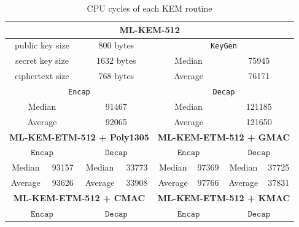 \documentclass[floatrow,journal=tches,submission]{iacrtrans}
\newcommand{\keygen}{\texttt{KeyGen}}
\newcommand{\encap}{\texttt{Encap}}
\newcommand{\decap}{\texttt{Decap}}
\begin{document}
\begin{table}
    \caption{CPU cycles of each KEM routine}\label{tbl:kem-performance}
    \begin{tabular}{|c|c|c|c|c|c|c|c|}
        \hline\hline
        \multicolumn{8}{|c|}{\bf ML-KEM-512} \\
        \hline
        \multicolumn{2}{|c|}{public key size} 
        & \multicolumn{2}{|c|}{800 bytes}
        & \multicolumn{4}{|c|}{ \keygen} \\
        \hline
        \multicolumn{2}{|c|}{secret key size} 
        & \multicolumn{2}{|c|}{1632 bytes} 
        & \multicolumn{2}{|c|}{Median} 
        & \multicolumn{2}{|c|}{75945} \\
        \hline
        \multicolumn{2}{|c|}{ciphertext size} 
        & \multicolumn{2}{|c|}{768 bytes} 
        & \multicolumn{2}{|c|}{Average} 
        & \multicolumn{2}{|c|}{76171} \\
        \hline
        \multicolumn{4}{|c|}{ \encap}
        & \multicolumn{4}{|c|}{\decap} \\
        \hline
        \multicolumn{2}{|c|}{Median} 
        & \multicolumn{2}{|c|}{91467} 
        & \multicolumn{2}{|c|}{Median} 
        & \multicolumn{2}{|c|}{121185} \\
        \hline
        \multicolumn{2}{|c|}{Average} 
        & \multicolumn{2}{|c|}{92065} 
        & \multicolumn{2}{|c|}{Average} 
        & \multicolumn{2}{|c|}{121650} \\
        \hline
        \multicolumn{4}{|c|}{\bf ML-KEM-ETM-512 + Poly1305}
        & \multicolumn{4}{|c|}{\bf ML-KEM-ETM-512 + GMAC} \\
        \hline
        \multicolumn{2}{|c|}{ $\encap$}
        & \multicolumn{2}{|c|}{$\decap$}
        & \multicolumn{2}{|c|}{ $\encap$}
        & \multicolumn{2}{|c|}{$\decap$} \\
        \hline
        Median & 93157 & Median & 33773 
        & Median & 97369 & Median & 37725 \\
        \hline
        Average & 93626 & Average & 33908 
        & Average & 97766 & Average & 37831 \\
        \hline
        \multicolumn{4}{|c|}{\bf ML-KEM-ETM-512 + CMAC}
        & \multicolumn{4}{|c|}{\bf ML-KEM-ETM-512 + KMAC} \\
        \hline
        \multicolumn{2}{|c|}{ $\encap$}
        & \multicolumn{2}{|c|}{$\decap$}
        & \multicolumn{2}{|c|}{ $\encap$}
        & \multicolumn{2}{|c|}{$\decap$} \\
        \hline

\end{tabular}
\end{table}
\end{document}
